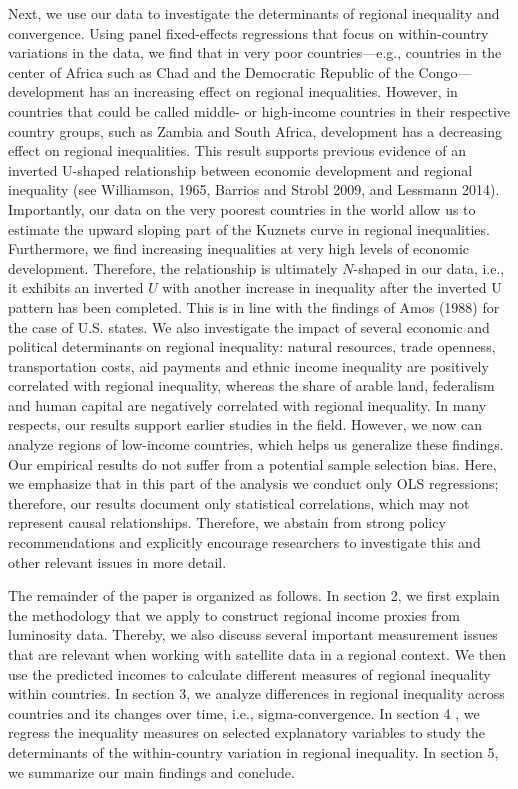 \documentclass[10pt]{article}
\begin{document}
Next, we use our data to investigate the determinants of regional inequality and convergence. 
Using panel fixed-effects regressions that focus on within-country variations in the data, we find that in very poor countries---e.g., countries in the center of Africa such as Chad and the Democratic Republic of the Congo---development has an increasing effect on regional inequalities. 
However, in countries that could be called middle- or high-income countries in their respective country groups, such as Zambia and South Africa, development has a decreasing effect on regional inequalities. 
This result supports previous evidence of an inverted U-shaped relationship between economic development and regional inequality (see Williamson, 1965, Barrios and Strobl 2009, and Lessmann 2014). 
Importantly, our data on the very poorest countries in the world allow us to estimate the upward sloping part of the Kuznets curve in regional inequalities.
Furthermore, we find increasing inequalities at very high levels of economic development. 
Therefore, the relationship is ultimately $N$-shaped in our data, i.e., it exhibits an inverted $U$ with another increase in inequality after the inverted U pattern has been completed. 
This is in line with the findings of Amos (1988) for the case of U.S. states. 
We also investigate the impact of several economic and political determinants on regional inequality: natural resources, trade openness, transportation costs, aid payments and ethnic income inequality are positively correlated with regional inequality, whereas the share of arable land, federalism and human capital are negatively correlated with regional inequality. 
In many respects, our results support earlier studies in the field. 
However, we now can analyze regions of low-income countries, which helps us generalize these findings. 
Our empirical results do not suffer from a potential sample selection bias. 
Here, we emphasize that in this part of the analysis we conduct only OLS regressions; therefore, our results document only statistical correlations, which may not represent causal relationships. 
Therefore, we abstain from strong policy recommendations and explicitly encourage researchers to investigate this and other relevant issues in more detail.

The remainder of the paper is organized as follows. 
In section 2, we first explain the methodology that we apply to construct regional income proxies from luminosity data. 
Thereby, we also discuss several important measurement issues that are relevant when working with satellite data in a regional context.
We then use the predicted incomes to calculate different measures of regional inequality within countries. 
In section 3, we analyze differences in regional inequality across countries and its changes over time, i.e., sigma-convergence. 
In section 4 , we regress the inequality measures on selected explanatory variables to study the determinants of the within-country variation in regional inequality. In section 5, we summarize our main findings and conclude.
\end{document}
